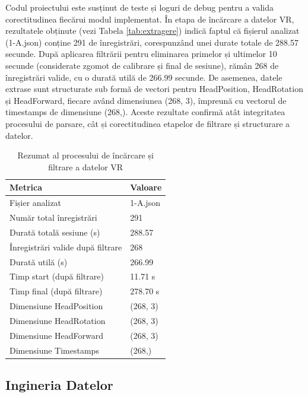 \documentclass[12pt,a4paper]{report}
\theoremstyle{definition}
\theoremstyle{remark}
\begin{document}
Codul proiectului este susținut de teste și loguri de debug pentru a valida corectitudinea fiecărui modul implementat. În etapa de încărcare a datelor VR, rezultatele obținute (vezi Tabela \ref{tab:extragere}) indică faptul că fișierul analizat (1-A.json) conține 291 de înregistrări, corespunzând unei durate totale de 288.57 secunde. După aplicarea filtrării pentru eliminarea primelor și ultimelor 10 secunde (considerate zgomot de calibrare și final de sesiune), rămân 268 de înregistrări valide, cu o durată utilă de 266.99 secunde. De asemenea, datele extrase sunt structurate sub formă de vectori pentru HeadPosition, HeadRotation și HeadForward, fiecare având dimensiunea (268, 3), împreună cu vectorul de timestamps de dimensiune (268,). Aceste rezultate confirmă atât integritatea procesului de parsare, cât și corectitudinea etapelor de filtrare și structurare a datelor.

\begin{table}[h]
\centering
\caption{Rezumat al procesului de încărcare și filtrare a datelor VR}
\label{tab:extragere}
\begin{tabular}{|l|l|}
\hline
\textbf{Metrica} & \textbf{Valoare} \\
\hline
Fișier analizat & 1-A.json \\
Număr total înregistrări & 291 \\
Durată totală sesiune (s) & 288.57 \\
Înregistrări valide după filtrare & 268 \\
Durată utilă (s) & 266.99 \\
Timp start (după filtrare) & 11.71 s \\
Timp final (după filtrare) & 278.70 s \\
Dimensiune HeadPosition & (268, 3) \\
Dimensiune HeadRotation & (268, 3) \\
Dimensiune HeadForward & (268, 3) \\
Dimensiune Timestamps & (268,) \\
\hline
\end{tabular}
\label{tab:vr_loading_debug}
\end{table}


\subsection{Ingineria Datelor}
\end{document}

